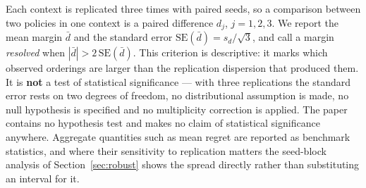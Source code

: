 Each context is replicated three times with paired seeds, so a comparison between two
policies in one context is a paired difference $d_j$, $j=1,2,3$. We report the mean margin
$\bar d$ and the standard error $\mathrm{SE}(\bar d)=s_d/\sqrt{3}$, and call a margin
\emph{resolved} when $|\bar d|>2\,\mathrm{SE}(\bar d)$. This criterion is descriptive: it
marks which observed orderings are larger than the replication dispersion that produced
them. It is \textbf{not} a test of statistical significance --- with three replications the
standard error rests on two degrees of freedom, no distributional assumption is made, no
null hypothesis is specified and no multiplicity correction is applied. The paper contains
no hypothesis test and makes no claim of statistical significance anywhere. Aggregate
quantities such as mean regret are reported as benchmark statistics, and where their
sensitivity to replication matters the seed-block analysis of Section~\ref{sec:robust}
shows the spread directly rather than substituting an interval for it.
